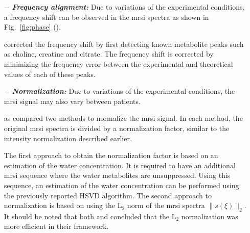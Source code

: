 \begin{enumerate}[leftmargin=*]

	\item[$-$] \textbf{\textit{Frequency alignment:}} Due to variations of the experimental conditions, a frequency shift can be observed in the \ac{mrsi} spectra as shown in Fig.~\ref{fig:phase} (\cite{Chen2002,Osorio-Garcia2012}).
	
\cite{Tiwari2012} corrected the frequency shift by first detecting known metabolite peaks such as choline, creatine and citrate. The frequency shift is corrected by minimizing the frequency error between the experimental and theoretical values of each of these peaks.

	\item[$-$] \textbf{\textit{Normalization:}} Due to variations of the experimental conditions, the \ac{mrsi} signal may also vary between patients.
	
\cite{Parfait2012} as \cite{Devos2004} compared two methods to normalize the \ac{mrsi} signal. In each method, the original \ac{mrsi} spectra is divided by a normalization factor, similar to the intensity normalization described earlier. 

The first approach to obtain the normalization factor is based on an estimation of the water concentration. It is required to have an additional \ac{mrsi} sequence where the water metabolites are unsuppressed. Using this sequence, an estimation of the water concentration can be performed using the previously reported HSVD algorithm.  The second approach to normalization is based on using the L$_2$ norm of the \ac{mrsi} spectra $\|s(\xi)\|_2$. 
It should be noted that both \cite{Parfait2012} and \cite{Devos2004} concluded that the L$_2$ normalization was more efficient in their framework.
 
\end{enumerate}